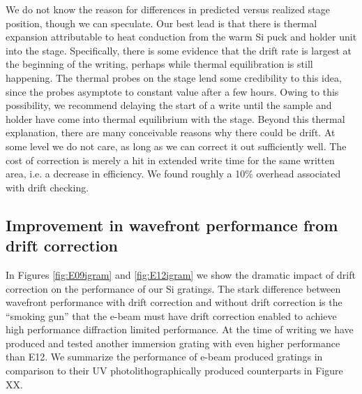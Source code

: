 \documentclass[]{spie}  %
\begin{document}
 We do not know the reason for differences in predicted versus realized stage position, though we can speculate.  Our best lead is that there is thermal expansion attributable to heat conduction from the warm Si puck and holder unit into the stage.  Specifically, there is some evidence that the drift rate is largest at the beginning of the writing, perhaps while thermal equilibration is still happening.  The thermal probes on the stage lend some credibility to this idea, since the probes asymptote to constant value after a few hours.  Owing to this possibility, we recommend delaying the start of a write until the sample and holder have come into thermal equilibrium with the stage.  Beyond this thermal explanation, there are many conceivable reasons why there could be drift.  At some level we do not care, as long as we can correct it out sufficiently well.  The cost of correction is merely a hit in extended write time for the same written area, i.e. a decrease in efficiency.  We found roughly a 10\% overhead associated with drift checking.

\subsection{Improvement in wavefront performance from drift correction}
In Figures \ref{fig:E09igram} and \ref{fig:E12igram} we show the dramatic impact of drift correction on the performance of our Si gratings.  The stark difference between wavefront performance with drift correction and without drift correction is the ``smoking gun'' that the e-beam must have drift correction enabled to achieve high performance diffraction limited performance.  At the time of writing we have produced and tested another immersion grating with even higher performance than E12.  We summarize the performance of e-beam produced gratings in comparison to their UV photolithographically produced counterparts in Figure XX.
\end{document}
